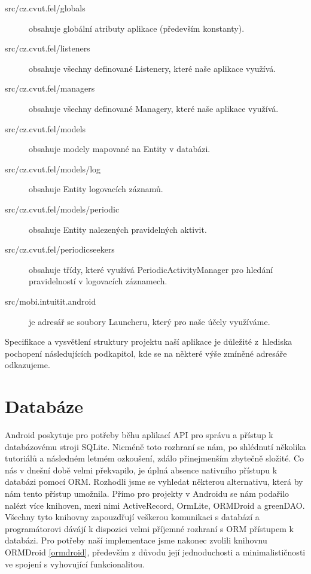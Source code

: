 \documentclass[thesis=M,czech]{FITthesis}[2012/06/26]
\begin{document}
\begin{description}
\item[src/cz.cvut.fel/globals] obsahuje globální atributy aplikace (především konstanty).
\item[src/cz.cvut.fel/listeners] obsahuje všechny definované Listenery, které naše aplikace využívá.
\item[src/cz.cvut.fel/managers] obsahuje všechny definované Managery, které naše aplikace využívá.
\item[src/cz.cvut.fel/models] obsahuje modely mapované na Entity v databázi.
\item[src/cz.cvut.fel/models/log] obsahuje Entity logovacích záznamů.
\item[src/cz.cvut.fel/models/periodic] obsahuje Entity nalezených pravidelných aktivit.
\item[src/cz.cvut.fel/periodicseekers] obsahuje třídy, které využívá PeriodicActivityManager pro hledání pravidelností v logovacích záznamech.
\item[src/mobi.intuitit.android] je adresář se soubory Launcheru, který pro naše účely využíváme.
\end{description}

Specifikace a vysvětlení struktury projektu naší aplikace je důležité z~hlediska pochopení následujících podkapitol, kde se na některé výše zmíněné adresáře odkazujeme.

\section{Databáze}
Android poskytuje pro potřeby běhu aplikací API pro správu a přístup k databázovému stroji SQLite. Nicméně toto rozhraní se nám, po shlédnutí několika tutoriálů a následném letmém ozkoušení, zdálo přinejmenším zbytečně složité. Co nás v dnešní době velmi překvapilo, je úplná absence nativního přístupu k databázi pomocí ORM. Rozhodli jsme se vyhledat některou alternativu, která by nám tento přístup umožnila. Přímo pro projekty v Androidu se nám podařilo nalézt více knihoven, mezi nimi ActiveRecord\cite{active_record}, OrmLite\cite{ormlite}, ORMDroid\cite{ormdroid} a greenDAO\cite{greendao}. Všechny tyto knihovny zapouzdřují veškerou komunikaci s databází a programátorovi dávájí k dispozici velmi příjemné rozhraní s ORM přístupem k databázi. Pro potřeby naší implementace jsme nakonec zvolili knihovnu ORMDroid \ref{ormdroid}, především z důvodu její jednoduchosti a minimalističnosti ve spojení s vyhovující funkcionalitou.
\end{document}
